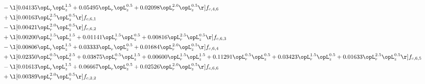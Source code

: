 \begin{alignat}{2}
& - \l[  0.04135 \opL_r \opL_z^{1.5} +  0.05495 \opL_r \opL_z^{0.5} +  0.02098 \opL_r^{2.0} \opL_z^{0.5}  \r] f_{c,4,6} \nonumber \\ 
& + \l[  0.00163 \opL_r^{2.5} \opL_z^{0.5}  \r] f_{c,6,1} \nonumber \\ 
& - \l[  0.00421 \opL_r^{2.0} \opL_z^{0.5}  \r] f_{c,6,2} \nonumber \\ 
& + \l[  0.00200 \opL_r^{1.5} \opL_z^{1.5} +  0.01141 \opL_r^{1.5} \opL_z^{0.5} +  0.00816 \opL_r^{2.5} \opL_z^{0.5}  \r] f_{c,6,3} \nonumber \\ 
& - \l[  0.00806 \opL_r \opL_z^{1.5} +  0.03333 \opL_r \opL_z^{0.5} +  0.01684 \opL_r^{2.0} \opL_z^{0.5}  \r] f_{c,6,4} \nonumber \\ 
& + \l[  0.02350 \opL_r^{0.5} \opL_z^{2.5} +  0.03875 \opL_r^{0.5} \opL_z^{1.5} +  0.00600 \opL_r^{1.5} \opL_z^{1.5} +  0.11291 \opL_r^{0.5} \opL_z^{0.5} +  0.03423 \opL_r^{1.5} \opL_z^{0.5} +  0.01633 \opL_r^{2.5} \opL_z^{0.5}  \r] f_{c,6,5} \nonumber \\ 
& - \l[  0.01613 \opL_r \opL_z^{1.5} +  0.06667 \opL_r \opL_z^{0.5} +  0.02526 \opL_r^{2.0} \opL_z^{0.5}  \r] f_{c,6,6} \nonumber \\ 
& + \l[  0.00389 \opL_r^{2.0} \opL_z^{0.5}  \r] f_{c,2,2} \nonumber \\ 
\end{alignat} 


